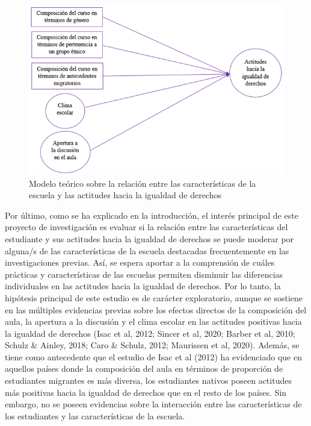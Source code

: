 \documentclass[12pt,twoside]{templates/facsothesis}
\begin{document}
\begin{figure}[!ht]

{\centering \includegraphics[width=0.8\linewidth,]{images/modelo_2} 

}

\caption{Modelo teórico sobre la relación entre las características de la escuela y las actitudes hacia la igualdad de derechos}\label{fig:modelo2}
\end{figure}

Por último, como se ha explicado en la introducción, el interés principal de este proyecto de investigación es evaluar si la relación entre las características del estudiante y sus actitudes hacia la igualdad de derechos se puede moderar por alguna/s de las características de la escuela destacadas frecuentemente en las investigaciones previas. Así, se espera aportar a la comprensión de cuáles prácticas y características de las escuelas permiten disminuir las diferencias individuales en las actitudes hacia la igualdad de derechos. Por lo tanto, la hipótesis principal de este estudio es de carácter exploratorio, aunque se sostiene en las múltiples evidencias previas sobre los efectos directos de la composición del aula, la apertura a la discusión y el clima escolar en las actitudes positivas hacia la igualdad de derechos (Isac et al, 2012; Sincer et al, 2020; Barber et al, 2010; Schulz \& Ainley, 2018; Caro \& Schulz, 2012; Maurissen et al, 2020). Además, se tiene como antecedente que el estudio de Isac et al (2012) ha evidenciado que en aquellos países donde la composición del aula en términos de proporción de estudiantes migrantes es más diversa, los estudiantes nativos poseen actitudes más positivas hacia la igualdad de derechos que en el resto de los países. Sin embargo, no se poseen evidencias sobre la interacción entre las características de los estudiantes y las características de la escuela.
\end{document}
